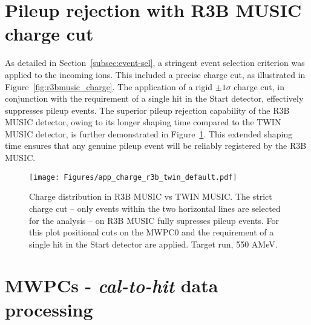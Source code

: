 \begin{appendices}
\section {Pileup rejection with R3B MUSIC charge cut}\label{app:r3bmusic_pileup}

As detailed in Section~\ref{subsec:event-sel}, a stringent event selection criterion was applied to the incoming ions. This included a precise charge cut, as illustrated in Figure~\ref{fig:r3bmusic_charge}. The application of a rigid $\pm 1 \sigma$ charge cut, in conjunction with the requirement of a single hit in the Start detector, effectively suppresses pileup events. The superior pileup rejection capability of the R3B MUSIC detector, owing to its longer shaping time compared to the TWIN MUSIC detector, is further demonstrated in Figure~\ref{fig:r3b_vs_twin_charge_def}. This extended shaping time ensures that any genuine pileup event will be reliably registered by the R3B MUSIC.
\begin{figure}[htpb]
    \centering
    \texttt{[image: Figures/app\_charge\_r3b\_twin\_default.pdf]}
    \caption{
	Charge distribution in R3B MUSIC vs TWIN MUSIC. The strict charge cut -- only events within the two horizontal lines are selected for the analysis -- on R3B MUSIC fully supresses pileup events. For this plot positional cuts on the MWPC0  and the requirement of a single hit in the Start detector are applied. Target run, 550 AMeV. 
    }
    \label{fig:r3b_vs_twin_charge_def}
\end{figure}

\section {MWPCs - \textit{cal-to-hit} data processing}



\end{appendices}
